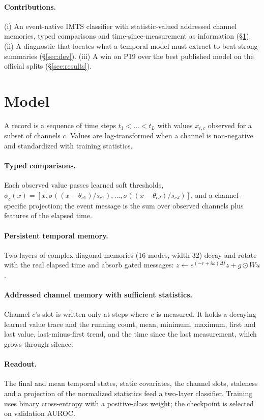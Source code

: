 \documentclass[11pt]{article}
\begin{document}
\paragraph{Contributions.} (i) An event-native IMTS classifier with statistic-valued addressed channel memories, typed comparisons and time-since-measurement as information (\S\ref{sec:model}). (ii) A diagnostic that locates what a temporal model must extract to beat strong summaries (\S\ref{sec:dev}). (iii) A win on P19 over the best published model on the official splits (\S\ref{sec:results}).

\section{Model}\label{sec:model}
A record is a sequence of time steps $t_1<\dots<t_L$ with values $x_{i,c}$ observed for a subset of channels $c$. Values are log-transformed when a channel is non-negative and standardized with training statistics.

\paragraph{Typed comparisons.} Each observed value passes learned soft thresholds, $\phi_c(x)=[x,\sigma((x-\theta_{c1})/s_{c1}),\dots,\sigma((x-\theta_{cJ})/s_{cJ})]$, and a channel-specific projection; the event message is the sum over observed channels plus features of the elapsed time.

\paragraph{Persistent temporal memory.} Two layers of complex-diagonal memories (16 modes, width 32) decay and rotate with the real elapsed time and absorb gated messages: $z\leftarrow e^{(-r+i\omega)\Delta t}z+g\odot W u$.

\paragraph{Addressed channel memory with sufficient statistics.} Channel $c$'s slot is written only at steps where $c$ is measured. It holds a decaying learned value trace and the running count, mean, minimum, maximum, first and last value, last-minus-first trend, and the time since the last measurement, which grows through silence.

\paragraph{Readout.} The final and mean temporal states, static covariates, the channel slots, staleness and a projection of the normalized statistics feed a two-layer classifier. Training uses binary cross-entropy with a positive-class weight; the checkpoint is selected on validation AUROC.
\end{document}
